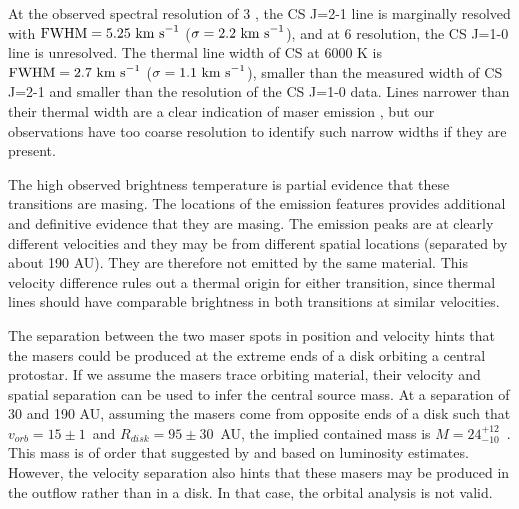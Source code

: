 \documentclass[twocolumn]{aastex62}
\begin{document}
At the observed spectral resolution of 3 \kms, the CS J=2-1 line is marginally
resolved with ${\mathrm{FWHM} = 5.25~\textrm{km~s}^{-1}}$ (${\sigma=2.2~\textrm{km~s}^{-1}}$), and at 6
\kms resolution, the CS J=1-0 line is unresolved.  The thermal line width of CS
at 6000 K is ${\mathrm{FWHM} = 2.7~\textrm{km~s}^{-1}}$ (${\sigma=1.1~\textrm{km~s}^{-1}}$),
smaller than the measured width of CS J=2-1 and smaller than the resolution
of the CS J=1-0 data. 
Lines narrower than their thermal width are a clear indication of maser
emission \citep{Elitzur1982a}, but our observations have too coarse resolution
to identify such narrow widths if they are present.


The high observed brightness temperature is partial evidence that these
transitions are masing.  The locations of the emission features provides
additional and definitive evidence that they are masing.  The emission peaks
are at clearly different velocities and they may be from different spatial
locations (separated by about 190 AU).  They are therefore not emitted by the
same material.  This velocity difference rules out a thermal origin for either
transition, since thermal lines should have comparable brightness in both
transitions at similar velocities.

The separation between the two maser spots in position and velocity hints
that the masers could be produced at the extreme ends of a disk orbiting
a central protostar.  
If we assume the masers trace orbiting material, their velocity and spatial
separation can be used to infer the central source mass.  At a separation of 30
\kms and 190 AU, assuming the masers come from opposite ends of a disk such
that $v_{orb}=15\pm1$~\kms and $R_{disk}=95\pm30$~AU, the implied contained mass is
$M=24_{-10}^{+12}$~\msun.  This mass is of order that suggested by
\citet{Ginsburg2017a} and \citet{Goddi2018a} based on luminosity estimates.
However, the velocity separation also hints that these masers may be produced
in the outflow rather than in a disk.  In that case, the orbital analysis
is not valid.
\end{document}
